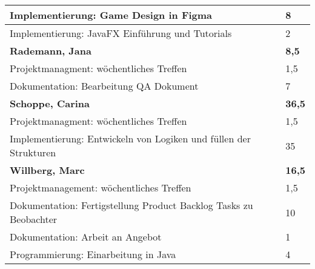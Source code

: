 \documentclass[a4paper,11pt]{scrartcl}
\begin{document}
\begin{longtable}{| p{13.8cm} | C{2.4cm} |}
  Implementierung: Game Design in Figma
	&
  8
	\\
	\hline
	
  Implementierung: JavaFX Einführung und Tutorials
	&
  2
	\\
	\hline
	\hline


	\textbf{Rademann, Jana} & \textbf{8,5}\\ %
	\hline

  Projektmanagment: wöchentliches Treffen
	&
  1,5
	\\
	\hline

  Dokumentation: Bearbeitung QA Dokument
	&
  7
	\\
	\hline
	\hline


	\textbf{Schoppe, Carina} & \textbf{36,5}\\ %
	\hline

  Projektmanagment: wöchentliches Treffen
	&
  1,5
	\\
	\hline

  Implementierung: Entwickeln von Logiken und füllen der Strukturen
	&
  35
	\\
	\hline
	\hline


	\textbf{Willberg, Marc} & \textbf{16,5}\\ %
	\hline

  Projektmanagement: wöchentliches Treffen
	&
  1,5
	\\
	\hline

  Dokumentation: Fertigstellung Product Backlog Tasks zu Beobachter
	&
  10
	\\
	\hline

  Dokumentation: Arbeit an Angebot
	&
  1
	\\
	\hline

  Programmierung: Einarbeitung in Java
	&
  4
	\\
	\hline

\end{longtable}
\end{document}
